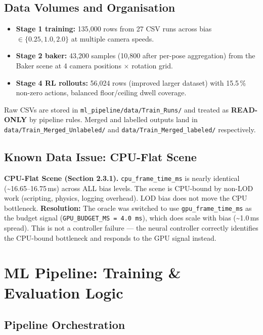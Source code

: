 \documentclass[12pt, a4paper]{article}
\begin{document}
\subsection{Data Volumes and Organisation}

\begin{itemize}
  \item \textbf{Stage 1 training:} 135,000 rows from 27 CSV runs across
    bias $\in \{0.25, 1.0, 2.0\}$ at multiple camera speeds.
  \item \textbf{Stage 2 baker:} 43,200 samples (10,800 after per-pose aggregation)
    from the Baker scene at 4 camera positions $\times$ rotation grid.
  \item \textbf{Stage 4 RL rollouts:} 56,024 rows (improved larger dataset) with
    15.5\,\% non-zero actions, balanced floor/ceiling dwell coverage.
\end{itemize}

Raw CSVs are stored in \texttt{ml\_pipeline/data/Train\_Runs/} and treated as
\textbf{READ-ONLY} by pipeline rules. Merged and labelled outputs land in
\texttt{data/Train\_Merged\_Unlabeled/} and \texttt{data/Train\_Merged\_labeled/}
respectively.

\subsection{Known Data Issue: CPU-Flat Scene}

\begin{warningbox}
\textbf{CPU-Flat Scene (Section 2.3.1).}
\texttt{cpu\_frame\_time\_ms} is nearly identical (\textasciitilde16.65–16.75\,ms)
across ALL bias levels. The scene is CPU-bound by non-LOD work (scripting,
physics, logging overhead). LOD bias does not move the CPU bottleneck.
\textbf{Resolution:} The oracle was switched to use \texttt{gpu\_frame\_time\_ms}
as the budget signal (\texttt{GPU\_BUDGET\_MS\,=\,4.0\,ms}), which does scale with
bias (\textasciitilde1.0\,ms spread). This is not a controller failure — the
neural controller correctly identifies the CPU-bound bottleneck and responds to
the GPU signal instead.
\end{warningbox}

\section{ML Pipeline: Training \& Evaluation Logic}
\label{sec:ml}

\subsection{Pipeline Orchestration}
\end{document}
